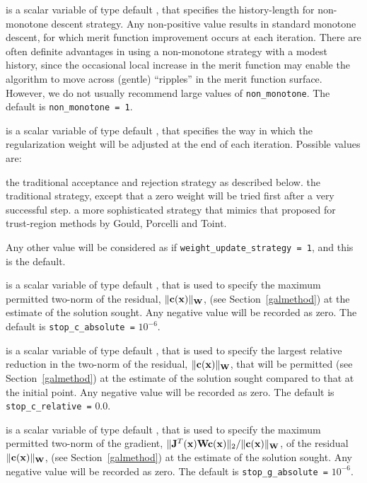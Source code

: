 \documentclass{galahad}
\begin{document}
\begin{description}
 is a scalar variable of type default \integer, that
specifies the history-length for non-monotone descent strategy.
Any non-positive value results in standard monotone descent, for which
merit function improvement occurs at each iteration. There are often
definite advantages in using a non-monotone strategy with a modest history,
since the occasional local increase in the merit function may
enable the algorithm to move across (gentle) ``ripples'' in
the merit function surface.
However, we do not usually recommend large values of {\tt non\_monotone}.
The default is {\tt non\_monotone = 1}.

 is a scalar variable of type default \integer,
that specifies the way in which the regularization weight will be adjusted
at the end of each iteration. Possible values are:
\begin{description}
 the traditional acceptance and rejection strategy as described below.
 the traditional strategy, except that a zero weight will be tried
first after a very successful step.
 a more sophisticated strategy that mimics that proposed
for trust-region methods by Gould, Porcelli and Toint.
\end{description}
Any other value will be considered as if {\tt weight\_update\_strategy = 1},
and this is the default.

 is a scalar variable of type default \realdp,
that is used to specify the maximum permitted two-norm of the
residual, $\|{\mathbf{c}}({\mathbf{x}})\|_{{\mathbf{W}}}$,
(see Section~\ref{galmethod}) at the estimate of the solution sought.
Any negative value will be recorded as zero.
The default is {\tt stop\_c\_absolute =} $10^{-6}$.

 is a scalar variable of type default \realdp,
that is used to specify the largest relative reduction in the two-norm of the
residual, $\|{\mathbf{c}}({\mathbf{x}})\|_{{\mathbf{W}}}$, that will be permitted
(see Section~\ref{galmethod}) at the estimate of the solution sought
compared to that at the initial point.
Any negative value will be recorded as zero.
The default is {\tt stop\_c\_relative =} $0.0$.

 is a scalar variable of type default \realdp,
that is used to specify the maximum permitted two-norm of the gradient,
 $\|{\mathbf{J}}^T({\mathbf{x}}) {\mathbf{W}} {\mathbf{c}}({\mathbf{x}})\|_2/\|{\mathbf{c}}({\mathbf{x}})\|_{{\mathbf{W}}}$,
of the residual  $\|{\mathbf{c}}({\mathbf{x}})\|_{{\mathbf{W}}}$,
(see Section~\ref{galmethod}) at the estimate of the solution sought.
Any negative value will be recorded as zero.
The default is {\tt stop\_g\_absolute =} $10^{-6}$.


\end{description}
\end{document}
